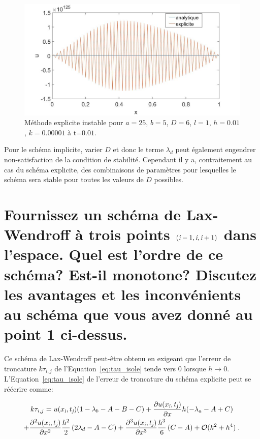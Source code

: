 \documentclass[a4paper, 12pt]{report}
\begin{document}
\begin{figure}[H]
  \center
  \includegraphics[scale=0.4]{images/q7D6instable.jpg}
  \caption{Méthode explicite instable pour $a=25$, $b=5$, $D=6$,
  $l=1$, $h=0.01$, $k = 0.00001$ à t=$0.01$.}
  \label{eq:instable_Q7}
\end{figure}

Pour le schéma implicite, varier $D$ et donc le terme $\lambda_d$ peut également
engendrer non-satisfaction de la condition de stabilité. Cependant il y a,
contraitement au cas du schéma explicite, des combinaisons de paramètres pour
lesquelles le schéma sera stable pour toutes les valeurs de $D$ possibles.

\section{Fournissez un schéma de Lax-Wendroff à trois points $\left(\textsl{i}-1,\textsl{i},\textsl{i}+1\right)$ dans l'espace. Quel est l'ordre de ce schéma? Est-il monotone? Discutez les avantages et les inconvénients au schéma que vous avez donné au point 1 ci-dessus.}


Ce schéma de Lax-Wendroff peut-être obtenu en exigeant que l'erreur de troncature
$k \tau_{i,j}$ de l'Equation~\ref{eq:tau_isole} tende vers 0 lorsque $h \to 0$.
L'Equation~\ref{eq:tau_isole} de l'erreur de troncature du schéma explicite
peut se réécrire comme:

\begin{multline}
  k\tau_{i,j} = u(x_{\textsl{i}},t_{\textsl{j}}) (1-\lambda_b-A-B-C) + \frac{\partial u(x_{\textsl{i}},t_{\textsl{j}})}{\partial x} h (-\lambda_a -A + C) \\
   + \frac{\partial^2 u(x_{\textsl{i}},t_{\textsl{j}})}{\partial x^2} \frac{h^2}{2} \left (2 \lambda_d - A - C \right ) + \frac{\partial^3 u(x_{\textsl{i}},t_{\textsl{j}})}{\partial x^3} \frac{h^3}{6} \left (C-A \right ) + \mathcal{O}(k^2+h^4) \;.
   \label{eq:tau_isole2}
\end{multline}
\end{document}
